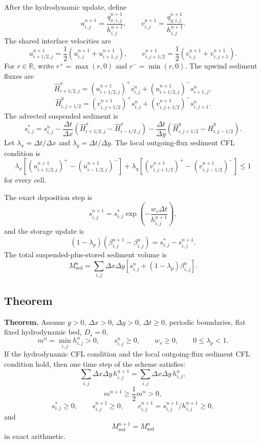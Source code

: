 After the hydrodynamic update, define
\[
u_{i,j}^{n+1}=\frac{q_{x,i,j}^{n+1}}{h_{i,j}^{n+1}},
\qquad
v_{i,j}^{n+1}=\frac{q_{y,i,j}^{n+1}}{h_{i,j}^{n+1}}.
\]
The shared interface velocities are
\[
u_{i+1/2,j}^{n+1}=\frac12\left(u_{i,j}^{n+1}+u_{i+1,j}^{n+1}\right),
\qquad
v_{i,j+1/2}^{n+1}=\frac12\left(v_{i,j}^{n+1}+v_{i,j+1}^{n+1}\right).
\]
For \(r\in\mathbb{R}\), write \(r^+=\max(r,0)\) and \(r^-=\min(r,0)\). The upwind sediment fluxes are
\[
\widehat H^x_{i+1/2,j}
=\left(u_{i+1/2,j}^{n+1}\right)^+s_{i,j}^{n}
+\left(u_{i+1/2,j}^{n+1}\right)^-s_{i+1,j}^{n},
\]
\[
\widehat H^y_{i,j+1/2}
=\left(v_{i,j+1/2}^{n+1}\right)^+s_{i,j}^{n}
+\left(v_{i,j+1/2}^{n+1}\right)^-s_{i,j+1}^{n}.
\]
The advected suspended sediment is
\[
s_{i,j}^{*}=s_{i,j}^{n}
-\frac{\Delta t}{\Delta x}
\left(\widehat H^x_{i+1/2,j}-\widehat H^x_{i-1/2,j}\right)
-\frac{\Delta t}{\Delta y}
\left(\widehat H^y_{i,j+1/2}-\widehat H^y_{i,j-1/2}\right).
\]
Let \(\lambda_x=\Delta t/\Delta x\) and \(\lambda_y=\Delta t/\Delta y\). The local outgoing-flux sediment CFL condition is
\[
\lambda_x\left[
\left(u_{i+1/2,j}^{n+1}\right)^+
-\left(u_{i-1/2,j}^{n+1}\right)^-
\right]
+
\lambda_y\left[
\left(v_{i,j+1/2}^{n+1}\right)^+
-\left(v_{i,j-1/2}^{n+1}\right)^-
\right]\le 1
\]
for every cell.

The exact deposition step is
\[
s_{i,j}^{n+1}=s_{i,j}^{*}
\exp\left(-\frac{w_s\Delta t}{h_{i,j}^{n+1}}\right),
\]
and the storage update is
\[
(1-\lambda_p)\left(\beta_{i,j}^{n+1}-\beta_{i,j}^{n}\right)
=s_{i,j}^{*}-s_{i,j}^{n+1}.
\]
The total suspended-plus-stored sediment volume is
\[
M_{\mathrm{sed}}^n=
\sum_{i,j}\Delta x\Delta y
\left[s_{i,j}^n+(1-\lambda_p)\beta_{i,j}^n\right].
\]

\subsection{Theorem}

\textbf{Theorem.}
Assume \(g>0\), \(\Delta x>0\), \(\Delta y>0\), \(\Delta t\ge0\), periodic boundaries, flat fixed hydrodynamic bed, \(D_s=0\),
\[
m^n=\min_{i,j}h_{i,j}^n>0,\qquad s_{i,j}^n\ge0,\qquad w_s\ge0,\qquad 0\le\lambda_p<1 .
\]
If the hydrodynamic CFL condition and the local outgoing-flux sediment CFL condition hold, then one time step of the scheme satisfies:
\[
\sum_{i,j}\Delta x\Delta y\,h_{i,j}^{n+1}
=
\sum_{i,j}\Delta x\Delta y\,h_{i,j}^{n},
\]
\[
m^{n+1}\ge \frac12 m^n>0,
\]
\[
s_{i,j}^{*}\ge0,\qquad s_{i,j}^{n+1}\ge0,\qquad
c_{i,j}^{n+1}=s_{i,j}^{n+1}/h_{i,j}^{n+1}\ge0,
\]
and
\[
M_{\mathrm{sed}}^{n+1}=M_{\mathrm{sed}}^n
\]
in exact arithmetic.


